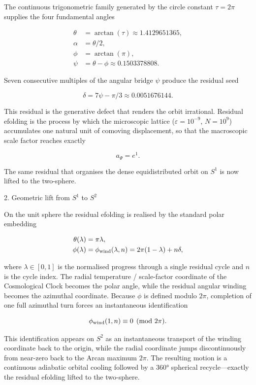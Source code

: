 The continuous trigonometric family generated by the circle constant \(\tau=2\pi\) supplies the four fundamental angles

\[
\begin{align*}
\theta&=\arctan(\tau)\approx1.4129651365,\\
\alpha&=\theta/2,\\
\phi&=\arctan(\pi),\\
\psi&=\theta-\phi\approx0.1503378808.
\end{align*}
\]

Seven consecutive multiples of the angular bridge \(\psi\) produce the residual seed

\[
\delta=7\psi-\pi/3\approx0.0051676144.
\]

This residual is the generative defect that renders the orbit irrational. Residual efolding is the process by which the microscopic lattice (\(\varepsilon=10^{-9}\), \(N=10^9\)) accumulates one natural unit of comoving displacement, so that the macroscopic scale factor reaches exactly

\[
a_{\Psi}=e^{1}.
\]

The same residual that organises the dense equidistributed orbit on \(S^1\) is now lifted to the two-sphere.

2. Geometric lift from \(S^1\) to \(S^2\)

On the unit sphere the residual efolding is realised by the standard polar embedding

\[
\begin{align*}
\theta(\lambda)&=\pi\lambda,\\
\phi(\lambda)&=\phi_{\rm wind}(\lambda,n)=2\pi(1-\lambda)+n\delta,
\end{align*}
\]

where \(\lambda\in[0,1]\) is the normalised progress through a single residual cycle and \(n\) is the cycle index. The radial temperature / scale-factor coordinate of the Cosmological Clock becomes the polar angle, while the residual angular winding becomes the azimuthal coordinate. Because \(\phi\) is defined modulo \(2\pi\), completion of one full azimuthal turn forces an instantaneous identification

\[
\phi_{\rm wind}(1,n)\equiv0\pmod{2\pi}.
\]

This identification appears on \(S^2\) as an instantaneous transport of the winding coordinate back to the origin, while the radial coordinate jumps discontinuously from near-zero back to the Arcan maximum \(2\pi\). The resulting motion is a continuous adiabatic orbital cooling followed by a 360° spherical recycle—exactly the residual efolding lifted to the two-sphere.

